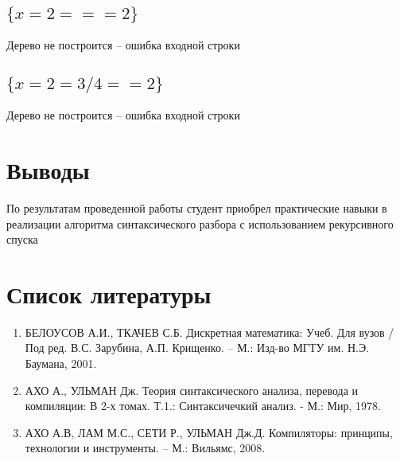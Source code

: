 		\subsection{$\{x=2===2\}$}
			Дерево не построится -- ошибка входной строки

		\subsection{$\{x=2=3/4==2\}$}
			Дерево не построится -- ошибка входной строки



	\newpage
	\section{Выводы}
	
	По результатам проведенной работы студент приобрел практические навыки в реализации алгоритма синтаксического разбора 
		с использованием рекурсивного спуска


	\section{Список литературы}
		\begin{enumerate}
			\item БЕЛОУСОВ А.И., ТКАЧЕВ С.Б. Дискретная математика: Учеб. Для вузов / Под ред. В.С. Зарубина, А.П. Крищенко. – М.: Изд-во МГТУ им. Н.Э. Баумана, 2001.
			\item АХО А., УЛЬМАН Дж. Теория синтаксического анализа, перевода и компиляции: В 2-х томах. Т.1.: Синтаксичечкий анализ. - М.: Мир, 1978.
			\item АХО А.В, ЛАМ М.С., СЕТИ Р., УЛЬМАН Дж.Д. Компиляторы: принципы, технологии и инструменты. – М.: Вильямс, 2008.
		\end{enumerate}
	